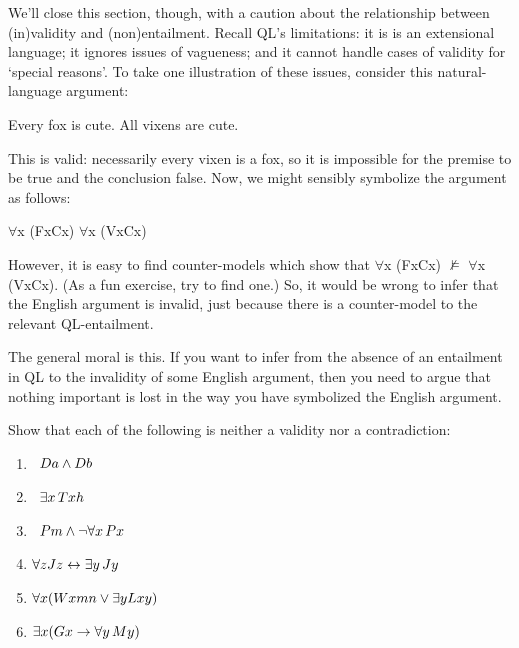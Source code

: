 We’ll close this section, though, with a caution about the relationship between (in)validity and (non)entailment. Recall QL’s limitations: it is is an extensional language; it ignores issues of vagueness; and it cannot handle cases of validity for ‘special reasons’. To take one illustration of these issues, consider this natural-language argument:
\begin{center}
Every fox is cute. \therefore All vixens are cute.
\end{center}
This is valid: necessarily every vixen is a fox, so it is impossible for the premise to be true and the conclusion false. Now, we might sensibly symbolize the argument as follows:
\begin{center}
$\forall$x (Fx\eif Cx) \therefore $\forall$x (Vx\eif Cx)
\end{center}
However, it is easy to find counter-models which show that $\forall$x (Fx\eif Cx) $\nvDash$ $\forall$x (Vx\eif Cx). (As a fun exercise, try to find one.) So, it would be wrong to infer that the English argument is invalid, just because there is a counter-model to the relevant QL-entailment.

The general moral is this. If you want to infer from the absence of an entailment in QL to the invalidity of some English argument, then you need to argue that nothing important is lost in the way you have symbolized the English argument.

\practiceproblems

\problempart
\label{pr.Contingent}
Show that each of the following is neither a validity nor a contradiction:
\begin{enumerate}
\item \leftsolutions\ $\mathord{D}a  \wedge \mathord{D}b$
\item \leftsolutions\ $\exists x\, \mathord{T}xh$
\item \leftsolutions\ $\mathord{P}m  \wedge \neg\forall x\, \mathord{P}x$
\item $\forall z \mathord{J}z \leftrightarrow \exists y\, \mathord{J}y$
\item $\forall x (\mathord{W}xmn \vee \exists y\mathord{L}xy)$
\item $\exists x (\mathord{G}x \rightarrow \forall y\, \mathord{M}y)$
\end{enumerate}

